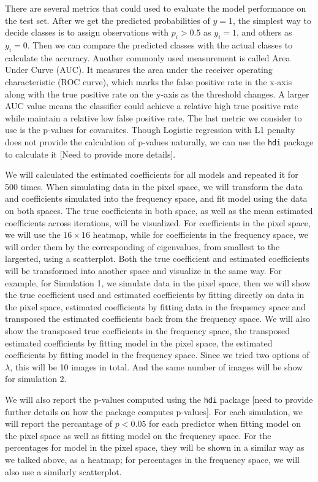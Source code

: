 \documentclass[12pt]{article}
\begin{document}
There are several metrics that could used to evaluate the model performance on the test set. After we get the predicted probabilities of \( y=1 \), the simplest way to decide classes is to assign observations with \( p_i > 0.5 \) as \( y_i = 1 \), and others as \( y_i = 0 \). Then we can compare the predicted classes with the actual classes to calculate the accuracy. Another commonly used measurement is called Area Under Curve (AUC). It measures the area under the receiver operating characteristic (ROC curve), which marks the false positive rate in the x-axis along with the true positive rate on the y-axis as the threshold changes. A larger AUC value means the classifier could achieve a relative high true positive rate while maintain a relative low false positive rate. The last metric we consider to use is the p-values for covaraites. Though Logistic regression with L1 penalty does not provide the calculation of p-values naturally, we can use the \texttt{hdi} package to calculate it [Need to provide more details].

We will calculated the estimated coefficients for all models and repeated it for 500 times. When simulating data in the pixel space, we will transform the data and coefficients simulated into the frequency space, and fit model using the data on both spaces. The true coefficients in both space, as well as the mean estimated coefficients across iterations, will be visualized. For coefficients in the pixel space, we will use the \( 16 \times 16 \) heatmap, while for coefficients in the frequency space, we will order them by the corresponding of eigenvalues, from smallest to the largested, using a scatterplot. Both the true coefficient and estimated coefficients will be transformed into another space and visualize in the same way. For example, for Simulation 1, we simulate data in the pixel space, then we will show the true coefficient used and estimated coefficients by fitting directly on data in the pixel space, estimated coefficients by fitting data in the frequency space and transposed the estimated coefficients back from the frequency space. We will also show the transposed true coefficients in the frequency space, the transposed estimated coefficients by fitting model in the pixel space, the estimated coefficients by fitting model in the frequency space. Since we tried two options of \( \lambda \), this will be 10 images in total. And the same number of images will be show for simulation 2.

We will also report the p-values computed using the \texttt{hdi} package [need to provide further details on how the package computes p-values]. For each simulation, we will report the percantage of \( p<0.05 \) for each predictor when fitting model on the pixel space as well as fitting model on the frequency space. For the percentages for model in the pixel space, they will be shown in a similar way as we talked above, as a heatmap; for percentages in the frequency space, we will also use a similarly scatterplot.
\end{document}
